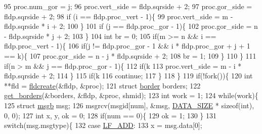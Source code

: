 \begin{DoxyCode}
{{{{95             proc.num\_gor = j;
96             proc.vert\_side = fldp.sqrside + 2;
97             proc.gor\_side = fldp.sqrside + 2;
98             \textcolor{keywordflow}{if} (i == fldp.proc\_vert - 1)\{
99                 proc.vert\_side = m - fldp.sqrside * i + 2;
100             \}
101             \textcolor{keywordflow}{if} (j == fldp.proc\_gor - 1)\{
102                 proc.gor\_side = n - fldp.sqrside * j + 2;
103             \}
104             \textcolor{keywordtype}{int} br = 0;
105             \textcolor{keywordflow}{if}(m >= n && i == fldp.proc\_vert - 1)\{
106                 \textcolor{keywordflow}{if}(j != fldp.proc\_gor - 1 && i * fldp.proc\_gor + j + 1 == k)\{
107                     proc.gor\_side = n - j * fldp.sqrside + 2;
108                     br = 1;
109                 \}
110             \}
111             \textcolor{keywordflow}{if}(n > m && j == fldp.proc\_gor - 1)\{
112                 \textcolor{keywordflow}{if}(k %
113                     proc.vert\_side = m - i * fldp.sqrside + 2;
114                 \}
115                 \textcolor{keywordflow}{if}(k %
116                     \textcolor{keywordflow}{continue};
117                 \}
118             \}
119             \textcolor{keywordflow}{if}(!fork())\{
120                 \textcolor{keywordtype}{int} **fld = \hyperlink{lifefld_8c_af4b0e2749728ae38395e689d7158c4d1}{fldcreate}(&fldp, &proc);
121                 \textcolor{keyword}{struct }\hyperlink{structborder}{border} borders;
122                 \hyperlink{lifefld_8c_a2ace44c9453b8a3039dc1ca159290af9}{get\_borders}(&borders, &fldp, &proc, shmid);
123                 \textcolor{keywordtype}{int} work = 1;
124                 \textcolor{keywordflow}{while}(work)\{
125                     \textcolor{keyword}{struct }\hyperlink{structmsgb}{msgb} msg;
126                     msgrcv(msgid[num], &msg, \hyperlink{lifeop_8h_adf764cbdea00d65edcd07bb9953ad2b7a7371e4160efe633ac7bbef1ce940ec83}{DATA\_SIZE} * \textcolor{keyword}{sizeof}(\textcolor{keywordtype}{int}), 0, 0);
127                     \textcolor{keywordtype}{int} x, y, ok = 0;
128                     \textcolor{keywordflow}{if}(num == 0)\{
129                         ok = 1;
130                     \}
131                     \textcolor{keywordflow}{switch}(msg.msgtype)\{
132                     \textcolor{keywordflow}{case} \hyperlink{lifeop_8h_abc6126af1d45847bc59afa0aa3216b04a3b9930fe73fc523417baa4bb2e7986ff}{LF\_ADD}:
133                         x = msg.data[0];
}}}}
\end{DoxyCode}
